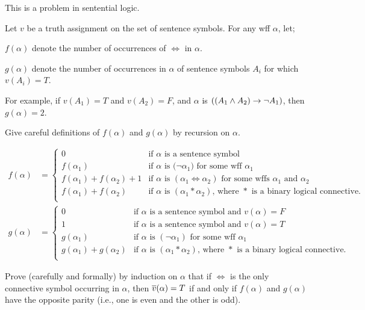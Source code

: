 \begin{problem}
  This is a problem in sentential logic.

  \step
  Let $v$ be a truth assignment on the set of sentence symbols.
  For any wff $\alpha$, let;
  \begin{enumroman}
    \item $f(\alpha)$ denote the number of occurrences of
      $\iff$ in $\alpha$.
    \item $g(\alpha)$ denote the number of occurrences in $\alpha$
      of sentence symbols $A_i$ for which $v(A_i) = T$.
  \end{enumroman}
  For example, if $v(A_1) = T$ and $v(A_2) = F$,
  and $\alpha$ is $((A_1 \land A_2) \rightarrow \lnot A_1)$,
  then $g(\alpha) = 2$.
  \begin{enumalph}
    \item Give careful definitions of $f(\alpha)$ and $g(\alpha)$
      by recursion on $\alpha$.
      \begin{Answer}
        \begin{align*}
          f(\alpha) &=
            \begin{cases}
              0 & \text{if $\alpha$ is a sentence symbol} \\
              f(\alpha_1) & \text{if $\alpha$ is $(\lnot \alpha_1$) for some wff $\alpha_1$} \\
              f(\alpha_1) + f(\alpha_2) + 1 & \text{if $\alpha$ is $(\alpha_1 \iff \alpha_2)$ for some wffs $\alpha_1$ and $\alpha_2$} \\
              f(\alpha_1) + f(\alpha_2) & \text{if $\alpha$ is $(\alpha_1 \ast \alpha_2)$, where $\ast$ is a binary logical connective.} \\
            \end{cases} \\
          g(\alpha) &=
            \begin{cases}
              0 & \text{if $\alpha$ is a sentence symbol and $v(\alpha) = F$} \\
              1 & \text{if $\alpha$ is a sentence symbol and $v(\alpha) = T$} \\
              g(\alpha_1) & \text{if $\alpha$ is $(\lnot \alpha_1)$ for some wff $\alpha_1$} \\
              g(\alpha_1) + g(\alpha_2) &
                \text{if $\alpha$ is $(\alpha_1 \ast \alpha_2)$, where $\ast$ is a binary logical connective.}\\
            \end{cases}
        \end{align*}
      \end{Answer}
    \newpage
    \item Prove (carefully and formally) by induction on $\alpha$
      that if $\iff$ is the only connective symbol occurring in $\alpha$,
      then $\overline{v}(\alpha) = T$ if and only if $f(\alpha)$ and $g(\alpha)$
      have the opposite parity (i.e., one is even and the other is odd).


\end{enumalph}
\end{problem}
